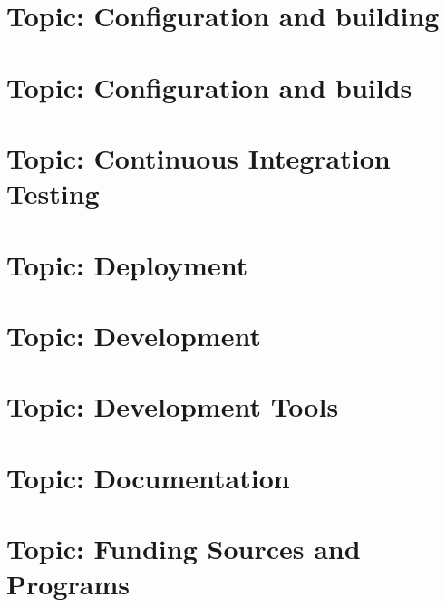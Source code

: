 \documentclass[twoside]{book}
\newcommand{\+}{\discretionary{\mbox{\scriptsize$\hookleftarrow$}}{}{}}
\begin{document}
\chapter{Topic\+: Configuration and building}
\label{md_markdown_topic_configuration_and_building}

\chapter{Topic\+: Configuration and builds}
\label{md_markdown_topic_configuration_and_builds}

\chapter{Topic\+: Continuous Integration Testing}
\label{md_markdown_topic_continuous_integration_testing}

\chapter{Topic\+: Deployment}
\label{md_markdown_topic_deployment}

\chapter{Topic\+: Development}
\label{md_markdown_topic_development}

\chapter{Topic\+: Development Tools}
\label{md_markdown_topic_development_tools}

\chapter{Topic\+: Documentation}
\label{md_markdown_topic_documentation}

\chapter{Topic\+: Funding Sources and Programs}
\label{md_markdown_topic_funding_sources_and_programs}

\end{document}
